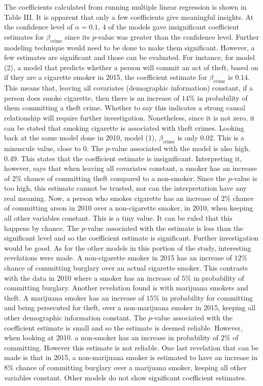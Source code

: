 \documentclass[a4paper, 10pt, conference]{ieeeconf}      %
\begin{document}
\parindent 10pt The coefficients calculated from running multiple linear regression is shown in Table III.   It is apparent that only a few coefficients give meaningful insights. At the confidence level of $\alpha  = 0.1$, $4$ of the models gave insignificant coefficient estimates for $\beta_{\text{crime}}$ since its $p$-value was greater than the confidence level. Further modeling technique would need to be done to make them significant. However, a few estimates are significant and those can be evaluated. For instance, for model (2), a model that predicts whether a person will commit an act of theft, based on if they are a cigarette smoker in 2015, the coefficient estimate for $\beta_{\text{crime}}$ is $0.14$. This means that, leaving all covariates (demographic information) constant, if a person does smoke cigarette, then there is an increase of $14\%$ in probability of them committing a theft crime. Whether to say this indicates a strong causal relationship will require further investigation. Nonetheless, since it is not zero, it can be stated that smoking cigarette is associated with theft crimes. Looking back at the same model done in 2010, model (1), $\beta_{\text{crime}}$ is only $0.02$. This is a minuscule value, close to $0$. The $p$-value associated with the model is also high, $0.49$. This states that the coefficient estimate is insignificant. Interpreting it, however, says that when leaving all covariates constant, a smoker has an increase of $2\%$ chance of committing theft compared to a non-smoker. Since the $p$-value is too high, this estimate cannot be trusted, nor can the interpretation have any real meaning. Now, a person who smokes cigarette has an increase of $2\%$ chance of committing arson in 2010 over a non-cigarette smoker, in 2010, when keeping all other variables constant. This is a tiny value. It can be ruled that this happens by chance. The $p$-value associated with the estimate is less than the significant level and so the coefficient estimate is significant. Further investigation would be good. As for the other models in this portion of the study, interesting revelations were made. A non-cigarette smoker in 2015 has an increase of $12\%$ chance of committing burglary over an actual cigarette smoker. This contrasts with the data in 2010 where a smoker has an increase of $5\%$ in probability of committing burglary. Another revelation found is with marijuana smokers and theft. A marijuana smoker has an increase of $15\%$ in probability for committing and being persecuted for theft, over a non-marijuana smoker in 2015, keeping all other demographic information constant. The $p$-value associated with the coefficient estimate is small and so the estimate is deemed reliable. However, when looking at 2010. a non-smoker has an increase in probability of $2\%$ of committing. However this estimate is not reliable. One last revelation that can be made is that in 2015, a non-marijuana smoker is estimated to have an increase in $8\%$ chance of committing burglary over a marijuana smoker, keeping all other variables constant. Other models do not show significant coefficient estimates.
\end{document}
